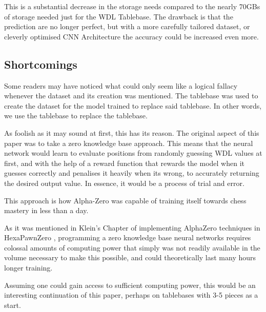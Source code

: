 This is a substantial decrease in the storage needs compared to the nearly 70GBs of storage needed just for the WDL Tablebase. The drawback is that the prediction are no longer perfect, but with a more carefully tailored dataset, or cleverly optimised CNN Architecture the accuracy could be increased even more.

\subsection{Shortcomings}
Some readers may have noticed what could only seem like a logical fallacy whenever the dataset and its creation was mentioned. The tablebase was used to create the dataset for the model trained to replace said tablebase. In other words, we use the tablebase to replace the tablebase.

As foolish as it may sound at first, this has its reason. The original aspect of this paper was to take a  zero knowledge base approach. This means that the neural network would learn to evaluate positions from randomly guessing WDL values at first, and with the help of a reward function that rewards the model when it guesses correctly and penalises it heavily when its wrong, to accurately returning the desired output value. In essence, it would be a process of trial and error.

This approach is how Alpha-Zero\cite{AlphaZero} was capable of training itself towards chess mastery in less than a day.

As it was mentioned in Klein's Chapter of implementing AlphaZero techniques in HexaPawnZero \cite{Klein}, programming a zero knowledge base neural networks requires colossal amounts of computing power that simply was not readily available in the volume necessary to make this possible, and could theoretically last many hours longer training.

Assuming one could gain access to sufficient computing power, this would be an interesting continuation of this paper, perhaps on tablebases with 3-5 pieces as a start.